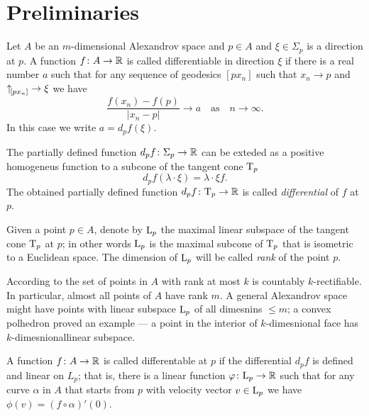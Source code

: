 \section{Preliminaries}

Let $A$ be an $m$-dimensional Alexandrov space and $p\in A$ and $\xi\in\Sigma_p$ is a direction at $p$.
A function $f\colon A\to \mathbb{R}$ is called differentiable in direction $\xi$ if there is a real number $a$ such that for any sequence of geodesics $[px_n]$ such that $x_n\to p$ and ${\uparrow}_{\hskip-0.15em[{p}{x_n}]}{}\to \xi$ we have
\[\frac{f(x_n)-f(p)}{|x_n-p|}\to a\quad\text{as}\quad n\to\infty.\]
In this case we write $a=d_pf(\xi)$.

The partially defined function $d_pf\colon\Sigma_p\to\mathbb{R}$ can be exteded as a positive homogeneus function to a subcone of the tangent cone $\text{\rm T}_p$
\[d_pf(\lambda\cdot\xi)=\lambda\cdot\xi f.\]
The obtained partially defined function $d_pf\colon\text{\rm T}_p\to\mathbb{R}$ is called \emph{differential} of $f$ at $p$.

Given a point $p\in A$, denote by $\text{\rm L}_p$ the maximal linear subspace of the tangent cone $\text{\rm T}_p$ at $p$;
in other words $\text{\rm L}_p$ is the maximal subcone of $\text{\rm T}_p$ that is isometric to a Euclidean space.
The dimension of $\text{\rm L}_p$ will be called \emph{rank} of the point $p$.

According to \cite{li-naber} the set of points in $A$ with rank at most $k$ is countably $k$-rectifiable.
In particular, almost all  points of $A$ have rank $m$.
A general Alexandrov space might have points with linear subspace $\text{\rm L}_p$ of all dimesnins $\le m$;
a convex polhedron proved an example --- a point in the interior of $k$-dimesnional face has $k$-dimesnionallinear subspace.


A function $f\colon A\to\mathbb{R}$ is called differentable at $p$ if the differential $d_pf$ is defined and linear on $L_p$;
that is, there is a linear function $\varphi\colon\text{\rm L}_p\to \mathbb{R}$ such that for any curve $\alpha$ in $A$ that starts from $p$ with velocity vector $v\in \text{\rm L}_p$ we have $\phi(v)=(f\circ\alpha)'(0)$.

